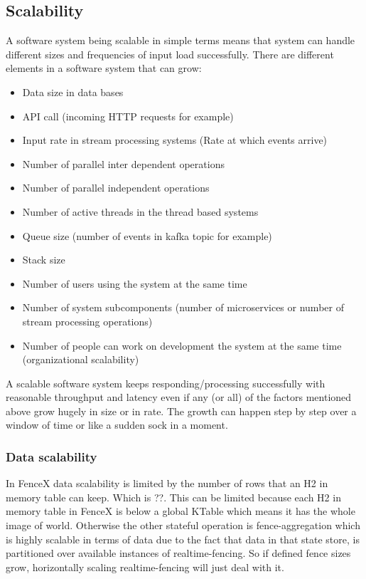 \documentclass[a4]{report}
\begin{document}
    \subsection{Scalability}
    A software system being scalable in simple terms means that system can handle different sizes and frequencies of
    input load successfully.
    There are different elements in a software system that can grow:
    \begin{itemize}
        \item Data size in data bases
        \item API call (incoming HTTP requests for example)
        \item Input rate in stream processing systems (Rate at which events arrive)
        \item Number of parallel inter dependent operations
        \item Number of parallel independent operations
        \item Number of active threads in the thread based systems
        \item Queue size (number of events in kafka topic for example)
        \item Stack size
        \item Number of users using the system at the same time
        \item Number of system subcomponents (number of microservices or number of stream processing operations)
        \item Number of people can work on development the system at the same time (organizational scalability)
    \end{itemize}
    A scalable software system keeps responding/processing successfully with reasonable throughput and latency even if
    any (or all) of the factors mentioned above grow hugely in size or in rate.
    The growth can happen step by step over a window of time or like a sudden sock in a moment.

    \subsubsection{Data scalability}
    In FenceX data scalability is limited by the number of rows that an H2 in memory table can keep. Which is ??.
    This can be limited because each H2 in memory table in FenceX is below a global KTable which means it has the whole
    image of world.
    Otherwise the other stateful operation is fence-aggregation which is highly scalable in terms of data due to the
    fact that data in that state store, is partitioned over available instances of realtime-fencing.
    So if defined fence sizes grow, horizontally scaling realtime-fencing will just deal with it.
\end{document}
